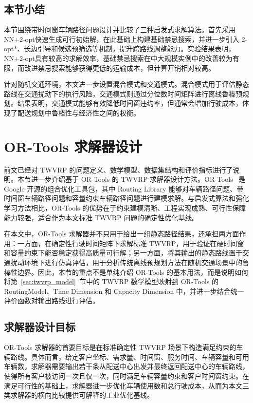 \documentclass[12pt,a4paper,UTF8]{article}
\begin{document}
\subsection{本节小结}
本节围绕带时间窗车辆路径问题设计并比较了三种启发式求解算法。首先采用 NN+2-opt快速生成可行初始解，在此基础上构建基础禁忌搜索，并进一步引入 2-opt*、长边引导和候选预筛选等机制，提升跨路线调整能力。实验结果表明，NN+2-opt具有较高的求解效率，基础禁忌搜索在中大规模实例中的改善较为有限，而改进禁忌搜索能够获得更低的运输成本，但计算开销相对较高。

针对随机交通环境，本文进一步设置混合模式和交通模式。混合模式用于评估静态路线在交通扰动下的执行风险，交通模式则通过分位数时间矩阵进行离线鲁棒预规划。结果表明，交通模式能够有效降低时间窗违约率，但通常会增加行驶成本，体现了配送规划中鲁棒性与经济性之间的权衡。

\clearpage

\section{OR-Tools 求解器设计}
\label{sec:ortools}

前文已经对 TWVRP 的问题定义、数学模型、数据集结构和评价指标进行了说明。本节进一步介绍基于 OR-Tools 的 TWVRP 求解器设计方法。OR-Tools~\cite{perron2023ortools} 是 Google 开源的组合优化工具包，其中 Routing Library 能够对车辆路径问题、带时间窗车辆路径问题和容量约束车辆路径问题进行建模求解。与启发式算法和强化学习方法相比，OR-Tools 的优势在于约束建模清晰、工程实现成熟、可行性保障能力较强，适合作为本文标准 TWVRP 问题的确定性优化基线。

在本文中，OR-Tools 求解器并不只用于给出一组静态路径结果，还承担两方面作用：一方面，在确定性行驶时间矩阵下求解标准 TWVRP，用于验证在硬时间窗和容量约束下能否稳定获得高质量可行解；另一方面，将其输出的静态路线置于交通扰动环境下进行仿真评估，用于分析传统离线预规划方法在随机交通场景中的鲁棒性边界。因此，本节的重点不是单纯介绍 OR-Tools 的基本用法，而是说明如何将第~\ref{sec:twvrp_model}~节中的 TWVRP 数学模型映射到 OR-Tools 的 RoutingModel、Time Dimension 和 Capacity Dimension 中，并进一步结合统一评价函数对输出路线进行评估。

\subsection{求解器设计目标}

OR-Tools 求解器的首要目标是在标准确定性 TWVRP 场景下构造满足约束的车辆路线。具体而言，给定客户坐标、需求量、时间窗、服务时间、车辆容量和可用车辆数，求解器需要输出若干条从配送中心出发并最终返回配送中心的车辆路线，使得所有客户被访问一次且仅一次，同时满足车辆容量约束和客户时间窗约束。在满足可行性的基础上，求解器进一步优化车辆使用数和总行驶成本，从而为本文三类求解器的横向比较提供可解释的工业优化基线。
\end{document}
